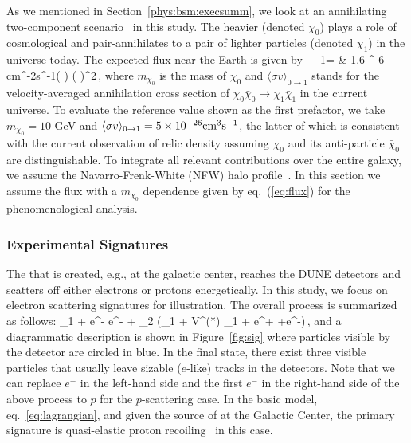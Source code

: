 As we mentioned in Section~\ref{phys:bsm:execsumm}, %
we look at an annihilating two-component  scenario~\cite{Belanger:2011ww} in this study. 
The heavier  (denoted $\chi_0$) plays a role of cosmological  and pair-annihilates to a pair of lighter  particles (denoted $\chi_1$) in the universe today. 
The expected flux near the Earth is given by~\cite{Agashe:2014yua,
Giudice:2017zke, Kim:2018veo}
\bea 
{}_1= & 1.6 ^{-6} {\rm cm}^{-2}{\rm s}^{-1}\times \left( \right) 
 \times \left( \right)^2\,,
\label{eq:flux}
\eea
where $m_{\chi_0}$ is the mass of $\chi_0$ and $\langle \sigma v\rangle_{0\rightarrow 1}$ stands for the velocity-averaged annihilation cross section of $\chi_0\bar{\chi}_0 \to \chi_1\bar{\chi}_1$ in the current universe.
To evaluate the reference value shown as the first prefactor, we take $m_{\chi_0} = 10$ GeV and $\langle \sigma v\rangle_{0\rightarrow 1}=5\times 10^{-26}{\rm cm}^3{\rm s}^{-1}$, the latter of which is consistent with the current observation of  relic density assuming $\chi_0$ and its anti-particle $\bar{\chi}_0$ are distinguishable. 
To integrate all relevant contributions over the entire galaxy, we assume the Navarro-Frenk-White (NFW)  halo profile~\cite{Navarro:1995iw, Navarro:1996gj}.
In this section we assume the  flux with a $m_{\chi_0}$ dependence given by eq.~(\ref{eq:flux}) for the phenomenological analysis. 


\subsubsection{Experimental Signatures}

The  that is created, e.g., at the galactic center, reaches the DUNE  
detectors and scatters off either electrons or protons energetically. 
In this study, we focus on electron scattering signatures for illustration. 
The overall process is summarized as follows:
\bea 
\chi_1 + e^- \to e^- + \chi_2 (\to \chi_1 + V^{(*)} \to \chi_1 + e^+ +e^-)\,,
\eea
and a diagrammatic description is shown in Figure~\ref{fig:sig} where %
particles visible by the detector are circled in blue. %
In the final state, there exist three visible particles that usually leave sizable ($e$-like) tracks in the %
detectors.  
Note that we can replace $e^-$ in the left-hand side and the first $e^-$ in the right-hand side of the above process to $p$ for the $p$-scattering case.
In the basic model, eq.~\eqref{eq:lagrangian}, and given the source of  at the Galactic Center,  the primary signature is quasi-elastic proton recoiling~\cite{pscattering} in this case.

